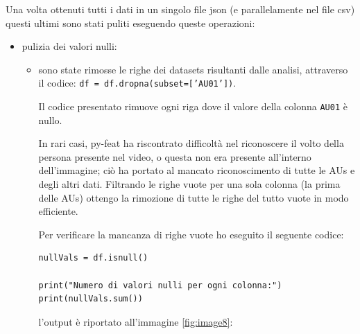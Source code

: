 Una volta ottenuti tutti i dati in un singolo file json (e parallelamente nel file csv) questi ultimi sono stati puliti eseguendo queste operazioni:
\begin{itemize}
    \item pulizia dei valori nulli:
    \begin{itemize}
        \item sono state rimosse le righe dei datasets risultanti dalle analisi, attraverso il codice: \texttt{df = df.dropna(subset=['AU01'])}.
        
        Il codice presentato rimuove ogni riga dove il valore della colonna \texttt{AU01} è nullo.
        
        In rari casi, py-feat ha riscontrato difficoltà nel riconoscere il volto della persona presente nel video, o questa non era presente all’interno dell’immagine; ciò ha portato al mancato riconoscimento di tutte le AUs e degli altri dati. Filtrando le righe vuote per una sola colonna (la prima delle AUs) ottengo la rimozione di tutte le righe del tutto vuote in modo efficiente. 
        
        Per verificare la mancanza di righe vuote ho eseguito il seguente codice:
        \begin{verbatim}
nullVals = df.isnull()

print("Numero di valori nulli per ogni colonna:")
print(nullVals.sum())
        \end{verbatim}
        l'output è riportato all'immagine \ref{fig:image8}:
        

\end{itemize}
\end{itemize}
